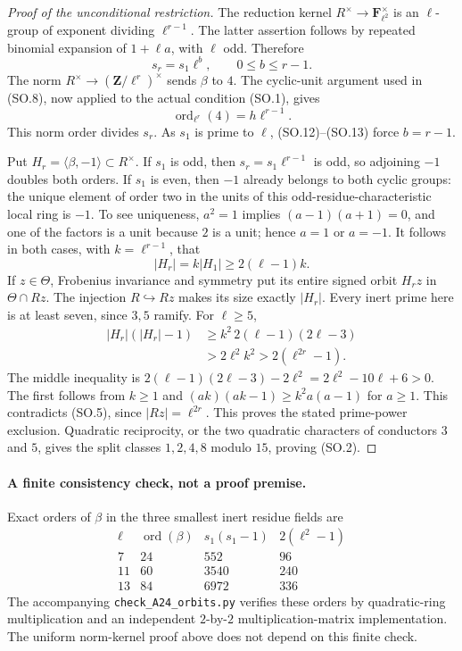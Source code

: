 \documentclass[11pt,a4paper]{article}
\begin{document}
\begin{proof}[Proof of the unconditional restriction]
The reduction kernel $R^\times\to\mathbf F_{\ell^2}^\times$
is an $\ell$-group of exponent dividing $\ell^{r-1}$.
The latter assertion follows by repeated binomial expansion of
$1+\ell a$, with $\ell$ odd.  Therefore
\[
                           s_r=s_1\ell^b,
                         \qquad0\le b\le r-1.              \tag{SO.12}
\]
The norm $R^\times\to(\mathbf Z/\ell^r)^\times$ sends
$\beta$ to $4$.  The cyclic-unit argument used in (SO.8),
now applied to the actual condition (SO.1), gives
\[
                   \operatorname{ord}_{\ell^r}(4)
                         =h\ell^{r-1}.                    \tag{SO.13}
\]
This norm order divides $s_r$.  As $s_1$ is prime to $\ell$,
(SO.12)--(SO.13) force $b=r-1$.

Put $H_r=\langle\beta,-1\rangle\subset R^\times$.
If $s_1$ is odd, then $s_r=s_1\ell^{r-1}$ is odd, so adjoining
$-1$ doubles both orders.  If $s_1$ is even, then $-1$ already
belongs to both cyclic groups: the unique element of order two
in the units of this odd-residue-characteristic local ring is
$-1$.  To see uniqueness, $a^2=1$ implies
$(a-1)(a+1)=0$, and one of the factors is a unit because
$2$ is a unit; hence $a=1$ or $a=-1$.
It follows in both cases, with $k=\ell^{r-1}$, that
\[
                      |H_r|=k|H_1|\ge2(\ell-1)k.           \tag{SO.14}
\]
If $z\in\Theta$, Frobenius invariance and symmetry put its
entire signed orbit $H_rz$ in $\Theta\cap Rz$.  The injection
$R\hookrightarrow Rz$ makes its size exactly $|H_r|$.
Every inert prime here is at least seven, since $3,5$ ramify.
For $\ell\ge5$,
\[
\begin{split}
 |H_r|(|H_r|-1)
  &\ge k^2\,2(\ell-1)(2\ell-3)\\
  &>2\ell^2 k^2
   >2(\ell^{2r}-1).
\end{split}                                                \tag{SO.15}
\]
The middle inequality is
$2(\ell-1)(2\ell-3)-2\ell^2=2\ell^2-10\ell+6>0$.
The first follows from $k\ge1$ and
$(ak)(ak-1)\ge k^2a(a-1)$ for $a\ge1$.
This contradicts (SO.5), since $|Rz|=\ell^{2r}$.
This proves the stated
prime-power exclusion.  Quadratic reciprocity, or the two
quadratic characters of conductors $3$ and $5$, gives the split
classes $1,2,4,8$ modulo $15$, proving (SO.2).
\end{proof}

\paragraph{A finite consistency check, not a proof premise.}
Exact orders of $\beta$ in the three smallest inert residue fields
are
\[
\begin{array}{c|r|r|r}
 \ell&\operatorname{ord}(\beta)&s_1(s_1-1)&2(\ell^2-1)\\\hline
 7&24&552&96\\
 11&60&3540&240\\
 13&84&6972&336
\end{array}
\]
The accompanying \texttt{check\_A24\_orbits.py} verifies these
orders by quadratic-ring multiplication and an independent
$2$-by-$2$ multiplication-matrix implementation.  The uniform
norm-kernel proof above does not depend on this finite check.
\end{document}
